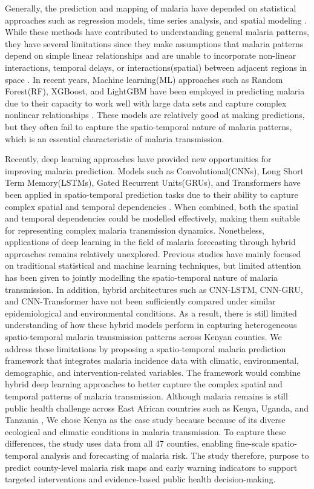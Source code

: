 Generally, the prediction and mapping of malaria have depended on statistical approaches such as regression models, time series analysis, and spatial modeling \cite{Held2022}. While these methods have contributed to understanding general malaria patterns, they have several limitations since they make assumptions that malaria patterns depend on simple linear relationships and are unable to incorporate non-linear interactions, temporal delays, or interactions(spatial) between adjacent regions in space \cite{Odhiambo2020}. In recent years, Machine learning(ML) approaches such as Random Forest(RF), XGBoost, and LightGBM have been employed in predicting malaria due to their capacity to work well with large data sets and capture complex nonlinear relationships \cite{Syafei2023, Yang2024}. These models are relatively good at making predictions, but they often fail to capture the spatio-temporal nature of malaria patterns, which is an essential characteristic of malaria transmission.

Recently, deep learning approaches have provided new opportunities for improving malaria prediction. Models such as Convolutional(CNNs), Long Short Term Memory(LSTMs), Gated Recurrent Units(GRUs), and Transformers have been applied in spatio-temporal prediction tasks due to their ability to capture complex spatial and temporal dependencies \cite{Rasheed2023}. When combined, both the spatial and temporal dependencies could be modelled effectively, making them suitable for representing complex malaria transmission dynamics. Nonetheless, applications of deep learning in the field of malaria  forecasting through  hybrid approaches remains relatively unexplored.
Previous studies have mainly focused on traditional statistical and machine learning techniques, but limited attention has been given to jointly modelling the spatio-temporal nature of malaria transmission. In addition, hybrid architectures such as CNN-LSTM, CNN-GRU, and CNN-Transformer have not been sufficiently compared under similar epidemiological and environmental conditions. As a result, there is still limited understanding of how these hybrid models perform in capturing heterogeneous spatio-temporal malaria transmission patterns across Kenyan counties. 
We address these limitations by proposing a spatio-temporal malaria prediction framework that integrates malaria incidence data with climatic, environmental, demographic, and intervention-related variables. The framework would combine hybrid deep learning approaches to better capture the complex spatial and temporal patterns of malaria transmission. Although malaria remains is still public health challenge across East African countries such as Kenya, Uganda, and Tanzania \cite{Snow2015}, We chose Kenya as the case study because because of its diverse ecological and climatic conditions \cite{amek2012spatial,Gething2023} in malaria transmission. To capture these differences, the study uses data from all 47 counties, enabling fine-scale spatio-temporal analysis and forecasting of malaria risk. The study therefore, purpose to predict  county-level malaria risk maps and early warning indicators to support targeted interventions and evidence-based public health decision-making.
